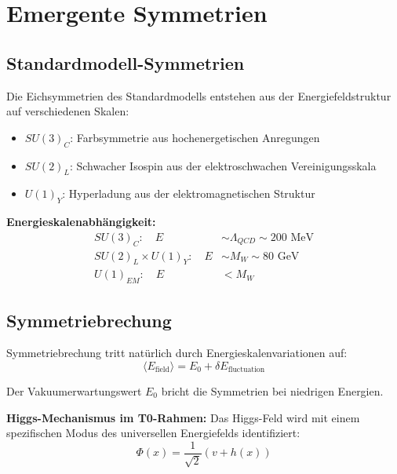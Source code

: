 \documentclass[12pt,a4paper]{report}
\begin{document}
	\section{Emergente Symmetrien}
	\label{sec:emergent_symmetries}
	
	\subsection{Standardmodell-Symmetrien}
	\label{subsec:standard_model_symmetries}
	
	Die Eichsymmetrien des Standardmodells entstehen aus der Energiefeldstruktur auf verschiedenen Skalen:
	
	\begin{itemize}
		\item \textbf{$SU(3)_C$}: Farbsymmetrie aus hochenergetischen Anregungen
		\item \textbf{$SU(2)_L$}: Schwacher Isospin aus der elektroschwachen Vereinigungsskala
		\item \textbf{$U(1)_Y$}: Hyperladung aus der elektromagnetischen Struktur
	\end{itemize}
	
	\textbf{Energieskalenabhängigkeit:}
	\begin{align}
		SU(3)_C: \quad E &\sim \Lambda_{QCD} \sim 200 \text{ MeV} \\
		SU(2)_L \times U(1)_Y: \quad E &\sim M_W \sim 80 \text{ GeV} \\
		U(1)_{EM}: \quad E &< M_W
	\end{align}
	
	\subsection{Symmetriebrechung}
	\label{subsec:symmetry_breaking}
	
	Symmetriebrechung tritt natürlich durch Energieskalenvariationen auf:
	\begin{equation}
		\langle E_{\text{field}} \rangle = E_0 + \delta E_{\text{fluctuation}}
	\end{equation}
	
	Der Vakuumerwartungswert $E_0$ bricht die Symmetrien bei niedrigen Energien.
	
	\textbf{Higgs-Mechanismus im T0-Rahmen:}
	Das Higgs-Feld wird mit einem spezifischen Modus des universellen Energiefelds identifiziert:
	\begin{equation}
		\Phi(x) = \frac{1}{\sqrt{2}}(v + h(x))
	\end{equation}
	
\end{document}
